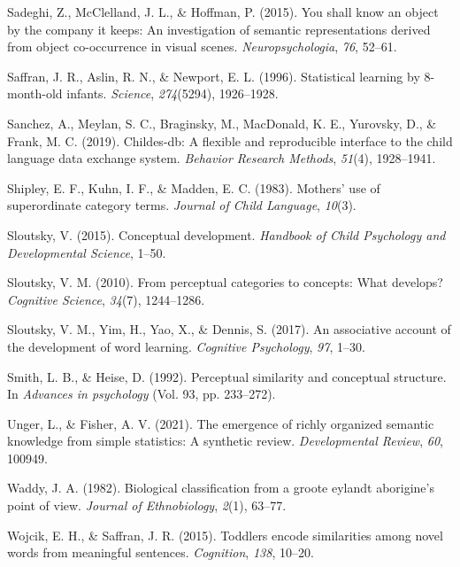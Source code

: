 \documentclass[english,,man,floatsintext]{apa6}
\begin{document}
\leavevmode\hypertarget{ref-sadeghi2015}{}%
Sadeghi, Z., McClelland, J. L., \& Hoffman, P. (2015). You shall know an object by the company it keeps: An investigation of semantic representations derived from object co-occurrence in visual scenes. \emph{Neuropsychologia}, \emph{76}, 52--61.

\leavevmode\hypertarget{ref-saffran1996}{}%
Saffran, J. R., Aslin, R. N., \& Newport, E. L. (1996). Statistical learning by 8-month-old infants. \emph{Science}, \emph{274}(5294), 1926--1928.

\leavevmode\hypertarget{ref-sanchez2019}{}%
Sanchez, A., Meylan, S. C., Braginsky, M., MacDonald, K. E., Yurovsky, D., \& Frank, M. C. (2019). Childes-db: A flexible and reproducible interface to the child language data exchange system. \emph{Behavior Research Methods}, \emph{51}(4), 1928--1941.

\leavevmode\hypertarget{ref-shipley1983}{}%
Shipley, E. F., Kuhn, I. F., \& Madden, E. C. (1983). Mothers' use of superordinate category terms. \emph{Journal of Child Language}, \emph{10}(3).

\leavevmode\hypertarget{ref-sloutsky2015}{}%
Sloutsky, V. (2015). Conceptual development. \emph{Handbook of Child Psychology and Developmental Science}, 1--50.

\leavevmode\hypertarget{ref-sloutsky2010}{}%
Sloutsky, V. M. (2010). From perceptual categories to concepts: What develops? \emph{Cognitive Science}, \emph{34}(7), 1244--1286.

\leavevmode\hypertarget{ref-sloutsky2017}{}%
Sloutsky, V. M., Yim, H., Yao, X., \& Dennis, S. (2017). An associative account of the development of word learning. \emph{Cognitive Psychology}, \emph{97}, 1--30.

\leavevmode\hypertarget{ref-smith1992}{}%
Smith, L. B., \& Heise, D. (1992). Perceptual similarity and conceptual structure. In \emph{Advances in psychology} (Vol. 93, pp. 233--272).

\leavevmode\hypertarget{ref-unger2021}{}%
Unger, L., \& Fisher, A. V. (2021). The emergence of richly organized semantic knowledge from simple statistics: A synthetic review. \emph{Developmental Review}, \emph{60}, 100949.

\leavevmode\hypertarget{ref-waddy1982}{}%
Waddy, J. A. (1982). Biological classification from a groote eylandt aborigine's point of view. \emph{Journal of Ethnobiology}, \emph{2}(1), 63--77.

\leavevmode\hypertarget{ref-wojcik2015}{}%
Wojcik, E. H., \& Saffran, J. R. (2015). Toddlers encode similarities among novel words from meaningful sentences. \emph{Cognition}, \emph{138}, 10--20.
\end{document}
